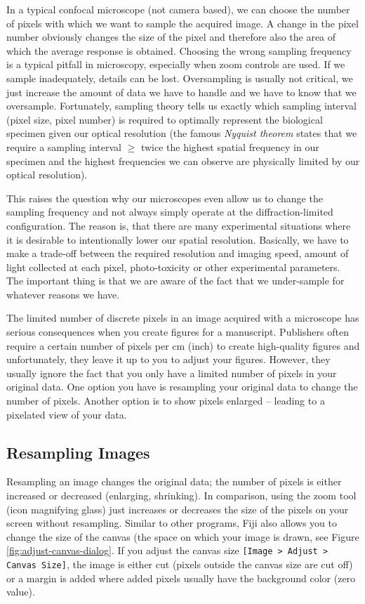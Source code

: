 In a typical confocal microscope (not camera based), we can choose the number of pixels with which we want to sample the acquired image. A change in the pixel number obviously changes the size of the pixel and therefore also the area of which the average response is obtained. Choosing the wrong sampling frequency is a typical pitfall in microscopy, especially when zoom controls are used. If we sample inadequately, details can be lost. Oversampling is usually not critical, we just increase the amount of data we have to handle and we have to know that we oversample. Fortunately, sampling theory tells us exactly which sampling interval (pixel size, pixel number) is required to optimally represent the biological specimen given our optical resolution (the famous \emph{Nyquist theorem} states that we require a sampling interval $\geq$ twice the highest spatial frequency in our specimen and the highest frequencies we can observe are physically limited by our optical resolution). 

This raises the question why our microscopes even allow us to change the sampling frequency and not always simply operate at the diffraction-limited configuration. The reason is, that there are many experimental situations where it is desirable to intentionally lower our spatial resolution. Basically, we have to make a trade-off between the required resolution and imaging speed, amount of light collected at each pixel, photo-toxicity or other experimental parameters. The important thing is that we are aware of the fact that we under-sample for whatever reasons we have.

The limited number of discrete pixels in an image acquired with a microscope has serious consequences when you create figures for a manuscript. Publishers often require a certain number of pixels per cm (inch) to create high-quality figures and unfortunately, they leave it up to you to adjust your figures. However, they usually ignore the fact that you only have a limited number of pixels in your original data. One option you have is resampling your original data to change the number of pixels. Another option is to show pixels enlarged -- leading to a pixelated view of your data.

\subsection{Resampling Images}

Resampling an image changes the original data; the number of pixels is either increased or decreased (enlarging, shrinking). In comparison, using the zoom tool (icon magnifying glass) just increases or decreases the size of the pixels on your screen without resampling. Similar to other programs, Fiji also allows you to change the size of the canvas (the space on which your image is drawn, see Figure \ref{fig:adjust-canvas-dialog}. If you adjust the canvas size \texttt{[Image > Adjust > Canvas Size]}, the image is either cut (pixels outside the canvas size are cut off) or a margin is added where added pixels usually have the background color (zero value). 

